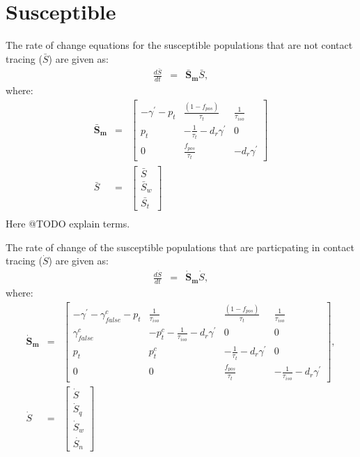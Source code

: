 \documentclass{article}
\begin{document}
\section{Susceptible}
The rate of change equations for the susceptible populations that are not contact tracing ($\bar{S}$) are given as:
\begin{eqnarray}
\frac{d\bar{S}}{dt} &=& \boldsymbol{\bar{S}_{m}}  \bar{S}, 
\end{eqnarray}
where:
\begin{eqnarray}
\boldsymbol{\bar{S}_{m}} &=&
\begin{bmatrix}
-\gamma^{'} - p_{t}  &  \frac{(1-f_{pos})}{\tau_{t}}             & \frac{1}{\tau_{iso}} \\ 
 p_{t}              & -\frac{1}{\tau_{t}} - d_{r} \gamma^{'}    & 0  \\ 
 0                  & \frac{f_{pos}}{\tau_{t}}                  &  -d_{r} \gamma^{'}
\end{bmatrix} \\ 
%
\bar{S} &=& 
\begin{bmatrix}
\bar{S} \\ \bar{S}_{w}\\ \bar{S_{t}}
\end{bmatrix} \\
\end{eqnarray}
Here @TODO explain terms.

The rate of change of the susceptible populations that are particpating in contact tracing ($\dot{S}$) are given as:
\begin{eqnarray}
\frac{d\dot{S}}{dt} &=& \boldsymbol{\dot{S}_{m}}  \dot{S},
\end{eqnarray}
where:
\begin{eqnarray}
\boldsymbol{\dot{S}_{m}} &=&
\begin{bmatrix}
-\gamma^{'} -\gamma^{c}_{false} - p_{t}  & \frac{1}{\tau_{iso}}     & \frac{(1-f_{pos})}{\tau_{t}}             & \frac{1}{\tau_{iso}} \\ 
\gamma^{c}_{false}          &  -p^{c}_{t}  - \frac{1}{\tau_{iso}} -d_{r} \gamma^{'}          &  0    & 0  \\ 
p_{t}                          &  p^{c}_{t}                  &  -\frac{1}{\tau_{t}}  -d_{r} \gamma^{'}  & 0 \\
0 & 0 & \frac{f_{pos}}{\tau_{t}}  & -\frac{1}{\tau_{iso}}  -d_{r} \gamma^{'}
\end{bmatrix}, \\
\dot{S} &=& 
\begin{bmatrix}
\dot{S} \\ \dot{S}_{q} \\ \dot{S}_{w}\\ \dot{S_{n}}
\end{bmatrix}
\end{eqnarray}
\end{document}
